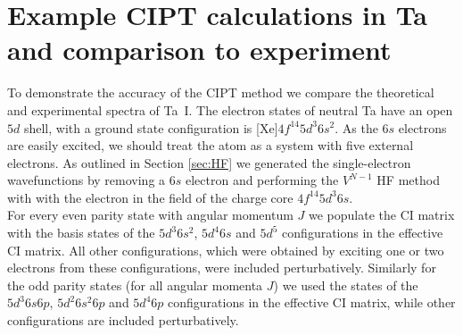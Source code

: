 \documentclass[10pt,a4paper, twoside, openright]{report}
\begin{document}
\section{Example CIPT calculations in Ta and comparison to experiment} \label{sec:TaCIPT}
To demonstrate the accuracy of the CIPT method we compare the theoretical and experimental spectra of Ta~I. The electron states of neutral Ta have an open $5d$ shell, with a  ground state configuration is [Xe]$4f^{14}5d^3 6s^2$. As the $6s$ electrons are easily excited, we should treat the atom as a system with five external electrons. As outlined in Section \ref{sec:HF} we generated the single-electron wavefunctions by removing a $6s$ electron and performing the $V^{N-1}$ HF method with with the electron in the field of the charge core $4f^{14}5d^3 6s$.\\
\linebreak
For every even parity state with angular momentum $J$ we populate the CI matrix with the basis states of the $5d^3 6s^2$, $5d^4 6s$ and $5d^5$  configurations in the effective CI matrix. All other configurations, which were obtained by exciting one or two electrons from these configurations, were included perturbatively. Similarly for the odd parity states (for all angular momenta $J$) we used the states of the $5d^3 6s 6p$, $5d^2 6s^2 6p$ and $5d^4 6p$ configurations in the effective CI matrix, while other configurations are included perturbatively.\\
\end{document}
